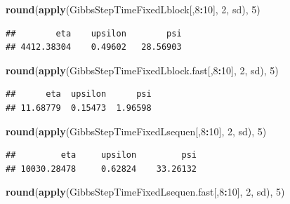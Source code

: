 \documentclass[
]{article}
\newenvironment{Shaded}{\begin{snugshade}}{\end{snugshade}}
\newcommand{\DecValTok}[1]{\textcolor[rgb]{0.00,0.00,0.81}{#1}}
\newcommand{\FunctionTok}[1]{\textcolor[rgb]{0.13,0.29,0.53}{\textbf{#1}}}
\newcommand{\NormalTok}[1]{#1}
\newcommand{\SpecialCharTok}[1]{\textcolor[rgb]{0.81,0.36,0.00}{\textbf{#1}}}
\begin{document}
\begin{Shaded}
\begin{Highlighting}[]
\FunctionTok{round}\NormalTok{(}\FunctionTok{apply}\NormalTok{(GibbsStepTimeFixedLblock[,}\DecValTok{8}\SpecialCharTok{:}\DecValTok{10}\NormalTok{], }\DecValTok{2}\NormalTok{, sd), }\DecValTok{5}\NormalTok{)}
\end{Highlighting}
\end{Shaded}

\begin{verbatim}
##        eta    upsilon        psi 
## 4412.38304    0.49602   28.56903
\end{verbatim}

\begin{Shaded}
\begin{Highlighting}[]
\FunctionTok{round}\NormalTok{(}\FunctionTok{apply}\NormalTok{(GibbsStepTimeFixedLblock.fast[,}\DecValTok{8}\SpecialCharTok{:}\DecValTok{10}\NormalTok{], }\DecValTok{2}\NormalTok{, sd), }\DecValTok{5}\NormalTok{)}
\end{Highlighting}
\end{Shaded}

\begin{verbatim}
##      eta  upsilon      psi 
## 11.68779  0.15473  1.96598
\end{verbatim}

\begin{Shaded}
\begin{Highlighting}[]
\FunctionTok{round}\NormalTok{(}\FunctionTok{apply}\NormalTok{(GibbsStepTimeFixedLsequen[,}\DecValTok{8}\SpecialCharTok{:}\DecValTok{10}\NormalTok{], }\DecValTok{2}\NormalTok{, sd), }\DecValTok{5}\NormalTok{)}
\end{Highlighting}
\end{Shaded}

\begin{verbatim}
##         eta     upsilon         psi 
## 10030.28478     0.62824    33.26132
\end{verbatim}

\begin{Shaded}
\begin{Highlighting}[]
\FunctionTok{round}\NormalTok{(}\FunctionTok{apply}\NormalTok{(GibbsStepTimeFixedLsequen.fast[,}\DecValTok{8}\SpecialCharTok{:}\DecValTok{10}\NormalTok{], }\DecValTok{2}\NormalTok{, sd), }\DecValTok{5}\NormalTok{)}
\end{Highlighting}
\end{Shaded}
\end{document}
